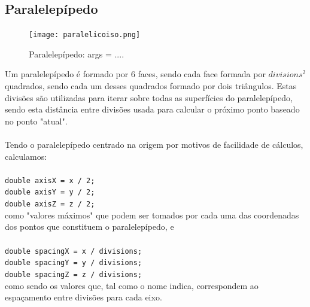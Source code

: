 \documentclass[a4paper]{article}
\begin{document}
\subsection{Paralelepípedo}
\begin{figure}[H]
\centering
\texttt{[image: paralelicoiso.png]}
\caption{Paralelepípedo: args = ....}
\end{figure}

Um paralelepípedo é formado por 6 faces, sendo cada face formada por $divisions^2$ quadrados, sendo cada um desses quadrados formado por dois triângulos. Estas divisões são utilizadas para iterar sobre todas as superfícies do paralelepípedo, sendo esta distância entre divisões usada para calcular o próximo ponto baseado no ponto "atual". \\
\\

Tendo o paralelepípedo centrado na origem por motivos de facilidade de cálculos, calculamos:\\
\\
\texttt{double axisX = x / 2;}\\
\texttt{double axisY = y / 2;}\\
\texttt{double axisZ = z / 2;}\\

como "valores máximos" que podem ser tomados por cada uma das coordenadas dos pontos que constituem o paralelepípedo, e\\
\\
\texttt{double spacingX = x / divisions;}\\
\texttt{double spacingY = y / divisions;}\\
\texttt{double spacingZ = z / divisions;}\\

como sendo os valores que, tal como o nome indica, correspondem ao espaçamento entre divisões para cada eixo.\\
\end{document}
